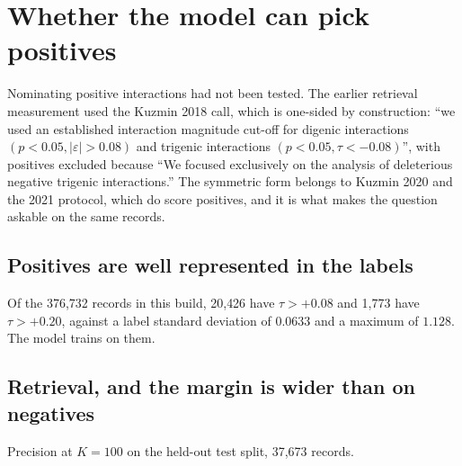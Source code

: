 \section{Whether the model can pick positives}

Nominating positive interactions had not been tested. The earlier retrieval
measurement used the Kuzmin 2018 call, which is one-sided by construction:
``we used an established interaction magnitude cut-off for digenic interactions
$(p < 0.05, |\varepsilon| > 0.08)$ and trigenic interactions
$(p < 0.05, \tau < -0.08)$'', with positives excluded because
``We focused exclusively on the analysis of deleterious negative trigenic
interactions.'' The symmetric form belongs to Kuzmin 2020 and the 2021 protocol,
which do score positives, and it is what makes the question askable on the same
records.

\subsection{Positives are well represented in the labels}

Of the 376{,}732 records in this build, 20{,}426 have $\tau > +0.08$ and 1{,}773
have $\tau > +0.20$, against a label standard deviation of $0.0633$ and a maximum
of $1.128$. The model trains on them.

\subsection{Retrieval, and the margin is wider than on negatives}

Precision at $K = 100$ on the held-out test split, 37{,}673 records.

